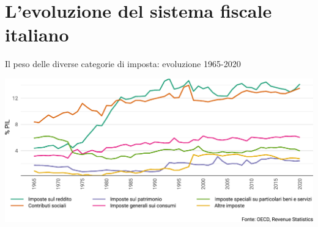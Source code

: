 \documentclass[11pt]{beamer}
\begin{document}
\section{L'evoluzione del sistema fiscale italiano}

\begin{frame}{Il peso delle diverse categorie di imposta: evoluzione 1965-2020}
\begin{center}
\includegraphics[width=\textwidth]{./figure/evoluzione-struttura-imposte-ITA-color.pdf}
\end{center}
\end{frame}
\end{document}
